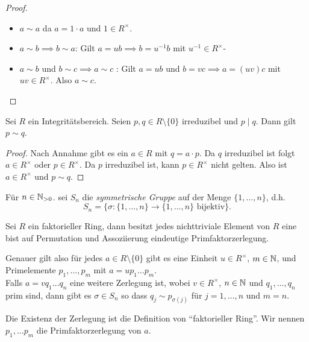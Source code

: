 \begin{proof}
	\begin{itemize}
		\item $a \sim a$ da $a = 1 \cdot a$ und $1 \in R^{\times}$.
		\item $a \sim b \implies b \sim a$: Gilt  $a = u b \implies b = u^{-1} b$ mit $u^{-1} \in R^{\times}$-
		\item $a \sim b$ und $b \sim c \implies a \sim c$ : Gilt $a = ub$ und $b = vc \implies a = (uv)c$ mit $uv \in R^{\times}$. Also $a \sim c$.
	\end{itemize}
\end{proof}

\begin{lemma}
	Sei $R$ ein Integritätsbereich. Seien $p,q \in R \setminus \{0\} $ irreduzibel und $p \mid q$.
	Dann gilt $p \sim q$.
\end{lemma}

\begin{proof}
	Nach Annahme gibt es ein $a \in R$ mit $q = a \cdot p$.
	Da $q$ irreduzibel ist folgt $a \in R^{\times}$ oder $p \in R^{\times}$.
	Da $p$ irreduzibel ist, kann $p \in R^{\times}$ nicht gelten.
	Also ist $a \in R^{\times}$ und $p \sim q$.
\end{proof}

\begin{definition}[Wh.]
	Für $n \in \mathbb{N}_{> 0}$. sei $S_{n}$ die \emph{symmetrische Gruppe} auf der Menge $\{1,\ldots,n\}$, d.h.
	\[
	S_{n} = \{ \sigma: \{1,\ldots, n\} \to \{1,\ldots,n\} \text{ bijektiv}\} 
	.\] 
\end{definition}

\begin{theorem}
	Sei $R$ ein faktorieller Ring, dann besitzt jedes nichttriviale Element von $R$ eine bist auf Permutation und Assoziierung 
	eindeutige Primfaktorzerlegung.

	Genauer gilt also für jedes $a \in R \setminus \{0\} $ gibt es eine Einheit $u \in R^{\times}$, $m \in \mathbb{N}$, und
	Primelemente $p_1,\ldots,p_{m}$ mit $a = u p_1 \ldots p_{m}$.\\
	Falls $a = v q_1 \ldots q_{n}$ eine weitere Zerlegung ist, wobei $v \in R^{\times}$, $n \in \mathbb{N}$ und $q_1,\ldots,q_{n}$ prim sind,
	dann gibt es $\sigma \in S_{n}$ so dass $q_{j} \sim p_{\sigma(j)}$ für $j = 1,\ldots,n$ und $m = n$.
\end{theorem}

	Die Existenz der Zerlegung ist die Definition von \enquote{faktorieller Ring}.
	Wir nennen $p_1,\ldots p_{m}$ die Primfaktorzerlegung von $a$.

